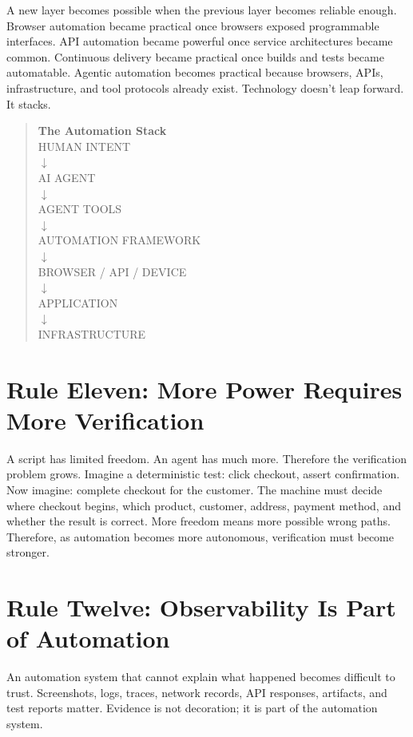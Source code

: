 \documentclass[11pt,twoside]{book}
\begin{document}
A new layer becomes possible when the previous layer becomes reliable enough. Browser automation became practical once browsers exposed programmable interfaces. API automation became powerful once service architectures became common. Continuous delivery became practical once builds and tests became automatable. Agentic automation becomes practical because browsers, APIs, infrastructure, and tool protocols already exist. Technology doesn't leap forward. It stacks.

\begin{quote}
\centering
\textbf{The Automation Stack}\\[0.5em]
HUMAN INTENT\\
$\downarrow$\\
AI AGENT\\
$\downarrow$\\
AGENT TOOLS\\
$\downarrow$\\
AUTOMATION FRAMEWORK\\
$\downarrow$\\
BROWSER / API / DEVICE\\
$\downarrow$\\
APPLICATION\\
$\downarrow$\\
INFRASTRUCTURE
\end{quote}

\section*{Rule Eleven: More Power Requires More Verification}

A script has limited freedom. An agent has much more. Therefore the verification problem grows. Imagine a deterministic test: click checkout, assert confirmation. Now imagine: complete checkout for the customer. The machine must decide where checkout begins, which product, customer, address, payment method, and whether the result is correct. More freedom means more possible wrong paths. Therefore, as automation becomes more autonomous, verification must become stronger.

\section*{Rule Twelve: Observability Is Part of Automation}

An automation system that cannot explain what happened becomes difficult to trust. Screenshots, logs, traces, network records, API responses, artifacts, and test reports matter. Evidence is not decoration; it is part of the automation system.
\end{document}
